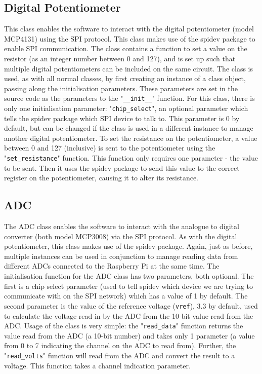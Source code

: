 \documentclass[twoside,a4]{report}
\def\br{\newline \newline \noindent}
\def\rpi{Raspberry Pi }
\begin{document}
	\subsection*{Digital Potentiometer} %
	This class enables the software to interact with the digital potentiometer (model MCP4131) using the SPI protocol. This class makes use of the spidev package to enable SPI communication. The class contains a function to set a value on the resistor (as an integer number between 0 and 127), and is set up such that multiple digital potentiometers can be included on the same circuit.\br
	The class is used, as with all normal classes, by first creating an instance of a class object, passing along the initialisation parameters. These parameters are set in the source code as the parameters to the "\texttt{\_\_init\_\_}" function. For this class, there is only one initialisation parameter: "\texttt{chip\_select}", an optional parameter which tells the spidev package which SPI device to talk to. This parameter is 0 by default, but can be changed if the class is used in a different instance to manage another digital potentiometer.\br
	To set the resistance on the potentiometer, a value between 0 and 127 (inclusive) is sent to the potentiometer using the "\texttt{set\_resistance}" function. This function only requires one parameter - the value to be sent. Then it uses the spidev package to send this value to the correct register on the potentiometer, causing it to alter its resistance.
	
	\subsection*{ADC} %
	The ADC class enables the software to interact with the analogue to digital converter (both model MCP3008) via the SPI protocol. As with the digital potentiometer, this class makes use of the spidev package. Again, just as before, multiple instances can be used in conjunction to manage reading data from different ADCs connected to the \rpi at the same time. \br
	The initialisation function for the ADC class has two parameters, both optional. The first is a chip select parameter (used to tell spidev which device we are trying to communicate with on the SPI network) which has a value of 1 by default. The second parameter is the value of the reference voltage (\texttt{vref}), 3.3 by default, used to calculate the voltage read in by the ADC from the 10-bit value read from the ADC. \br
	Usage of the class is very simple: the "\texttt{read\_data}" function returns the value read from the ADC (a 10-bit number) and takes only 1 parameter (a value from 0 to 7 indicating the channel on the ADC to read from). Further, the "\texttt{read\_volts}" function will read from the ADC and convert the result to a voltage. This function takes a channel indication parameter.
	
\end{document}

